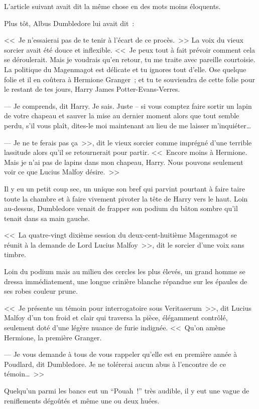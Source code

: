 L'article suivant avait dit la même chose en des mots moins éloquents.

Plus tôt, Albus Dumbledore lui avait dit~:
\begin{em}
<<~Je n'essaierai pas de te tenir à l'écart de ce procès.~>> La voix du vieux sorcier avait été douce et inflexible. <<~Je peux tout à fait prévoir comment cela se déroulerait. Mais je voudrais qu'en retour, tu me traite avec pareille courtoisie. La politique du Magenmagot est délicate et tu ignores tout d'elle. Ose quelque folie et il en coûtera à Hermione Granger~; et tu te souviendra de cette folie pour le restant de tes jours, Harry James Potter-Evans-Verres.

--- Je comprends, dit Harry. Je sais. Juste -- si vous comptez faire sortir un lapin de votre chapeau et sauver la mise au dernier moment alors que tout semble perdu, s'il vous plaît, dites-le moi maintenant au lieu de me laisser m'inquiéter…

--- Je ne te ferais pas ça~>>, dit le vieux sorcier comme imprégné d'une terrible lassitude alors qu'il se retournerait pour partir. <<~Encore moins à Hermione. Mais je n'ai pas de lapins dans mon chapeau, Harry. Nous pouvons seulement voir ce que Lucius Malfoy désire.~>> \end{em}

Il y eu un petit coup sec, un unique son bref qui parvint pourtant à faire taire toute la chambre et à faire vivement pivoter la tête de Harry vers le haut. Loin au-dessus, Dumbledore venait de frapper son podium du bâton sombre qu'il tenait dans sa main gauche.

<<~La quatre-vingt dixième session du deux-cent-huitième Magenmagot se réunit à la demande de Lord Lucius Malfoy~>>, dit le sorcier d'une voix sans timbre.

Loin du podium mais au milieu des cercles les plus élevés, un grand homme se dressa immédiatement, une longue crinière blanche répandue sur les épaules de ses robes couleur prune.

<<~Je présente un témoin pour interrogatoire sous Veritaserum~>>, dit Lucius Malfoy d'un ton froid et clair qui traversa la pièce, élégamment contrôlé, seulement doté d'une légère nuance de furie indignée. <<~Qu'on amène Hermione, la première Granger.

--- Je vous demande à tous de vous rappeler qu'elle est en première année à Poudlard, dit Dumbledore. Je ne tolérerai aucun abus à l'encontre de ce témoin…~>>

Quelqu'un parmi les bancs eut un “Pouah~!” très audible, il y eut une vague de reniflements dégoûtés et même une ou deux huées.

